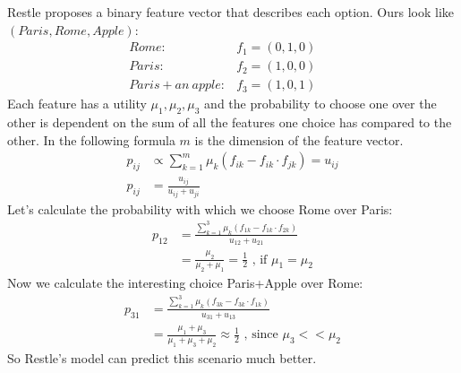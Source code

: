 \documentclass[../main/Notes.tex]{subfiles}
\begin{document}
Restle proposes a binary feature vector that describes each option. Ours look like $(Paris, Rome, Apple)$:
\begin{align*}
& Rome: & f_1 = (0, 1, 0) & & &\\
& Paris: & f_2 = (1, 0, 0) & & &\\
& Paris + an~apple: & f_3 = (1, 0, 1) & & &
\end{align*}
Each feature has a utility $\mu_1,\mu_2,\mu_3$ and the probability to choose one over the other is dependent on the sum of all the features one choice has compared to the other. In the following formula $m$ is the dimension of the feature vector.
\begin{align*}
p_{ij} &\propto \sum_{k=1}^{m}\mu_k(f_{ik}-f_{ik}\cdot f_{jk}) = u_{ij}\\
p_{ij} &= \frac{u_{ij}}{u_{ij}+u_{ji}}
\end{align*}
Let's calculate the probability with which we choose Rome over Paris:
\begin{align*}
p_{12} &= \frac{\sum_{k=1}^3\mu_k(f_{1k}-f_{1k} \cdot f_{2k})}{u_{12}+u_{21}}\\
       &= \frac{\mu_2}{\mu_2+\mu_1} = \frac{1}{2} \text{ , if $\mu_1=\mu_2$}
\end{align*}
Now we calculate the interesting choice Paris+Apple over Rome:
\begin{align*}
p_{31} &= \frac{\sum_{k=1}^3\mu_k(f_{3k}-f_{3k} \cdot f_{1k})}{u_{31}+u_{13}}\\
       &= \frac{\mu_1+\mu_3}{\mu_1+\mu_3+\mu_2} \approx \frac{1}{2} \text{ , since $\mu_3 << \mu_2$}
\end{align*}
So Restle's model can predict this scenario much better.
\end{document}

